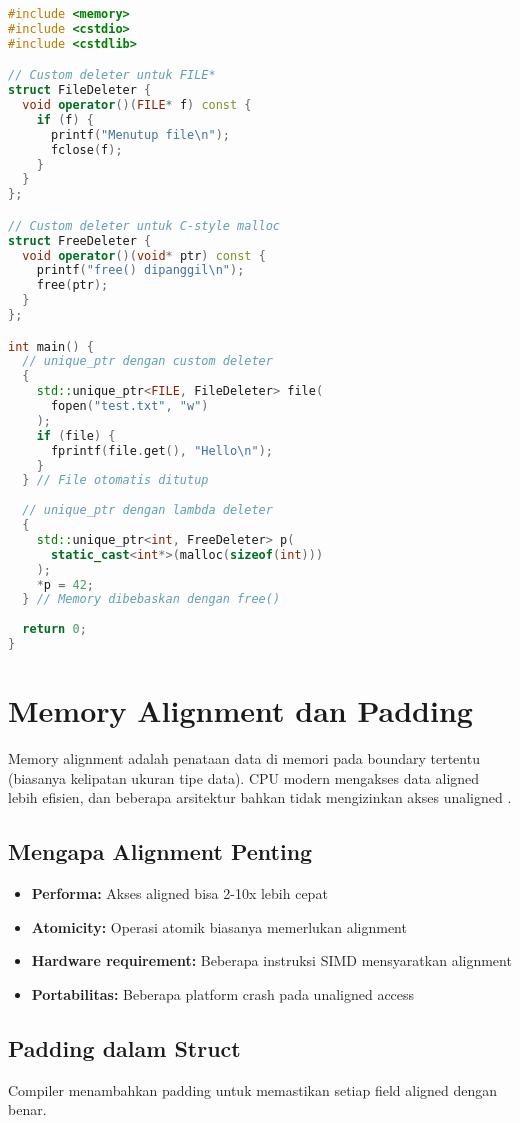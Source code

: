 \documentclass[../main.tex]{subfiles}
\begin{document}
\begin{lstlisting}[language=C++, caption={Custom deleter dengan unique\_ptr}]
#include <memory>
#include <cstdio>
#include <cstdlib>

// Custom deleter untuk FILE*
struct FileDeleter {
  void operator()(FILE* f) const {
    if (f) {
      printf("Menutup file\n");
      fclose(f);
    }
  }
};

// Custom deleter untuk C-style malloc
struct FreeDeleter {
  void operator()(void* ptr) const {
    printf("free() dipanggil\n");
    free(ptr);
  }
};

int main() {
  // unique_ptr dengan custom deleter
  {
    std::unique_ptr<FILE, FileDeleter> file(
      fopen("test.txt", "w")
    );
    if (file) {
      fprintf(file.get(), "Hello\n");
    }
  } // File otomatis ditutup
  
  // unique_ptr dengan lambda deleter
  {
    std::unique_ptr<int, FreeDeleter> p(
      static_cast<int*>(malloc(sizeof(int)))
    );
    *p = 42;
  } // Memory dibebaskan dengan free()
  
  return 0;
}
\end{lstlisting}

\section{Memory Alignment dan Padding}
Memory alignment adalah penataan data di memori pada boundary tertentu (biasanya kelipatan ukuran tipe data). CPU modern mengakses data aligned lebih efisien, dan beberapa arsitektur bahkan tidak mengizinkan akses unaligned \parencite{iso-c-draft-n1570,cpp-reference}.

\subsection{Mengapa Alignment Penting}
\begin{itemize}
  \item \textbf{Performa:} Akses aligned bisa 2-10x lebih cepat
  \item \textbf{Atomicity:} Operasi atomik biasanya memerlukan alignment
  \item \textbf{Hardware requirement:} Beberapa instruksi SIMD mensyaratkan alignment
  \item \textbf{Portabilitas:} Beberapa platform crash pada unaligned access
\end{itemize}

\subsection{Padding dalam Struct}
Compiler menambahkan padding untuk memastikan setiap field aligned dengan benar.
\end{document}
